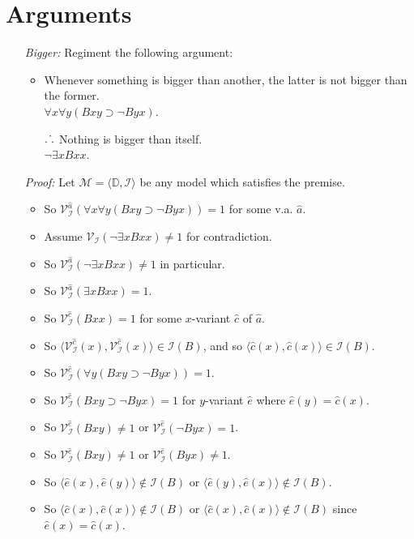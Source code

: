 \documentclass[a4paper, 11pt]{article} %
\newcommand{\tuple}[1]{\langle#1\rangle} %
\def\therefore{\ensuremath{\ldotp\dot\,\ldotp}}
\newcommand{\I}{\mathcal{I}}
\newcommand{\M}{\mathcal{M}}
\newcommand{\D}{\mathbb{D}}
\newcommand{\VV}[2]{\mathcal{V}_{#1}^{#2}} %
\begin{document}
\section*{Arguments}

\begin{enumerate}
  \item[\it Bigger:] Regiment the following argument:
    \begin{itemize}
      \item Whenever something is bigger than another, the latter is not bigger than the former.\\
        $\forall x\forall y(Bxy \supset \neg Byx)$.
      \item[\therefore] Nothing is bigger than itself.\\
        $\neg\exists x Bxx$.
    \end{itemize}
  \item[\it Proof:] Let $\M=\tuple{\D,\I}$ be any model which satisfies the premise. 
    \begin{itemize}
      \item So $\VV{\I}{\hat{a}}(\forall x\forall y(Bxy \supset \neg Byx))=1$ for some v.a. $\hat{a}$.
      \item Assume $\VV{\I}{}(\neg\exists x Bxx)\neq 1$ for contradiction. 
      \item So $\VV{\I}{\hat{a}}(\neg\exists x Bxx)\neq 1$ in particular.
      \item So $\VV{\I}{\hat{a}}(\exists x Bxx)=1$.
      \item So $\VV{\I}{\hat{c}}(Bxx)=1$ for some $x$-variant $\hat{c}$ of $\hat{a}$.
      \item So $\tuple{\VV{\I}{\hat{c}}(x),\VV{\I}{\hat{c}}(x)}\in\I(B)$, and so $\tuple{\hat{c}(x),\hat{c}(x)}\in\I(B)$.
      \item So $\VV{\I}{\hat{c}}(\forall y(Bxy \supset \neg Byx))=1$.
      \item So $\VV{\I}{\hat{e}}(Bxy \supset \neg Byx)=1$ for $y$-variant $\hat{e}$ where $\hat{e}(y)=\hat{c}(x)$.
      \item So $\VV{\I}{\hat{e}}(Bxy)\neq 1$ or $\VV{\I}{\hat{e}}(\neg Byx)=1$.
      \item So $\VV{\I}{\hat{e}}(Bxy)\neq 1$ or $\VV{\I}{\hat{e}}(Byx)\neq 1$.
      \item So $\tuple{\hat{e}(x),\hat{e}(y)}\notin\I(B)$ or $\tuple{\hat{e}(y),\hat{e}(x)}\notin\I(B)$.
      \item So $\tuple{\hat{c}(x),\hat{c}(x)}\notin\I(B)$ or $\tuple{\hat{c}(x),\hat{c}(x)}\notin\I(B)$ since $\hat{e}(x)=\hat{c}(x)$.

\end{itemize}
\end{enumerate}
\end{document}
